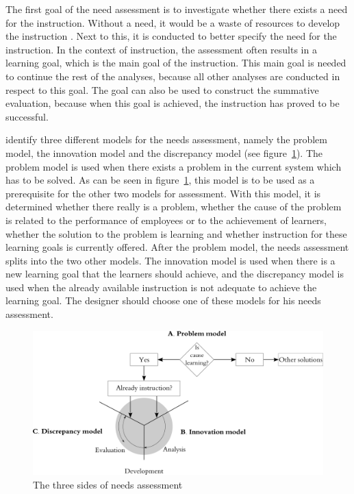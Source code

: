 \documentclass[11pt,twoside]{report} %
\begin{document}
The first goal of the need assessment is to investigate whether there exists a need for the instruction.  Without a need, it would be a waste of resources to develop the instruction \cite{smithragan}. Next to this, it is conducted to better specify the need for the instruction. In the context of instruction, the assessment often results in a learning goal, which is the main goal of the instruction. This main goal is needed to continue the rest of the analyses, because all other analyses are conducted in respect to this goal. The goal can also be used to construct the summative evaluation, because when this goal is achieved, the instruction has proved to be successful.

 identify three different models for the needs assessment, namely the problem model, the innovation model and the discrepancy model (see figure~\ref{fig:needsassessment}). The problem model is used when there exists a problem in the current system which has to be solved. As can be seen in figure~\ref{fig:needsassessment}, this model is to be used as a prerequisite for the other two models for assessment. With this model, it is determined whether there really is a problem, whether the cause of the problem is related to the performance of employees or to the achievement of learners, whether the solution to the problem is learning and whether instruction for these learning goals is currently offered. After the problem model, the needs assessment splits into the two other models. The innovation model is used when there is a new learning goal that the learners should achieve, and the discrepancy model is used when the already available instruction is not adequate to achieve the learning goal. The designer should choose one of these models for his needs assessment.

\begin{figure}[h]
\centering
\includegraphics[width=\textwidth]{needsassessment}
\caption{The three sides of needs assessment \protect\cite{smithragan}\label{fig:needsassessment}}
\end{figure}
\end{document}
